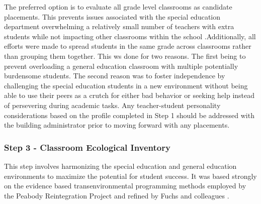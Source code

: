 \documentclass[twoside]{article}
\begin{document}
The preferred option is to evaluate all grade level classrooms as candidate placements. This prevents issues associated with the special education department overwhelming a relatively small number of teachers with extra students while not impacting other classrooms within the school \parencite{avramidis2000survey,barnes2015teachers, mukherjee2000inclusion}.Additionally, all efforts were made to spread students in the same grade across classrooms rather than grouping them together. This ws done for two reasons. The first being to prevent overloading a general education classroom with multiple potentially burdensome students. The second reason was to foster independence by challenging the special education students in a new environment without being able to use their peers as a crutch for either bad behavior or seeking help instead of persevering during academic tasks.  Any teacher-student personality considerations based on the profile completed in Step 1 should be addressed with the building administrator prior to moving forward with any placements. 

\subsubsection{Step 3 - Classroom Ecological Inventory}
This step involves harmonizing the special education and general education environments to maximize the potential for student success. It was based strongly on the evidence based transenvironmental programming methods employed by the Peabody Reintegration Project and refined by Fuchs and colleagues \parencite{fuchs1993conservative,fuchs1994classroom,marden2013criteria,mathes1998preparing,wadsworth1999preparing,wadsworth1999preparing}. 
\end{document}
